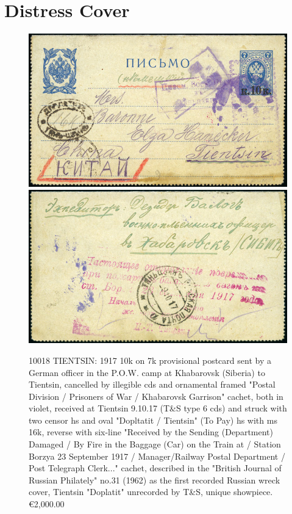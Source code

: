 \section{Distress Cover}

\begin{figure}[htbp]
\centering
\includegraphics[width=.95\textwidth]{../russian-post-offices-in-china/10018.jpg}
\includegraphics[width=.95\textwidth]{../russian-post-offices-in-china/10018-1.jpg}

\caption{
10018	TIENTSIN: 1917 10k on 7k provisional postcard sent by a German 
officer in the P.O.W. camp at Khabarovsk (Siberia) to Tientsin, cancelled by 
illegible cds and ornamental framed "Postal Division / Prisoners of War / 
Khabarovsk Garrison" cachet, both in violet, received at Tientsin 9.10.17 
(T\&S type 6 cds) and struck with two censor hs and oval "Dopltatit / 
Tientsin" (To Pay) hs with ms 16k, reverse with six-line
"Received by the Sending (Department) Damaged / By Fire in the Baggage (Car) 
on the Train at / Station Borzya 23 September 1917 / Manager/Railway Postal 
Department / Post Telegraph Clerk..." cachet, described in the
"British Journal of Russian Philately" no.31 (1962) as the first 
recorded Russian wreck cover, Tientsin "Doplatit" unrecorded by T\&S, 
unique showpiece.
\euro 2,000.00
}  
\end{figure}





                                                                      